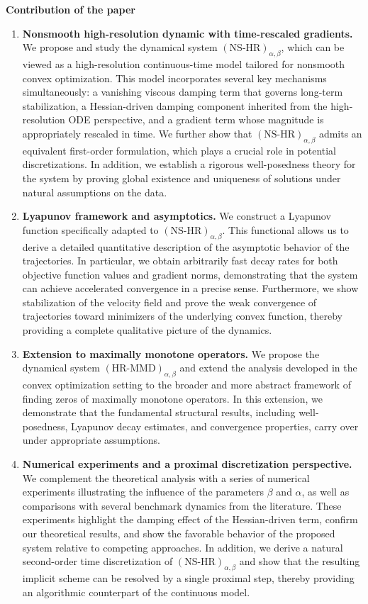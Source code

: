 \documentclass[11pt]{article}
\numberwithin{equation}{section}
\begin{document}
\textbf{Contribution of the paper} 
\begin{enumerate}
    \item \textbf{Nonsmooth high-resolution dynamic with time-rescaled gradients.} We propose and study the dynamical system $(\text{NS-HR})_{\alpha,\beta}$, which can be viewed as a high-resolution continuous-time model tailored for {nonsmooth} convex optimization. This model incorporates several key mechanisms simultaneously: a vanishing viscous damping term that governs long-term stabilization, a {Hessian-driven damping} component inherited from the high-resolution ODE perspective, and a gradient term whose magnitude is appropriately rescaled in time. We further show that $(\text{NS-HR})_{\alpha,\beta}$ admits an equivalent first-order formulation, which plays a crucial role in potential discretizations. In addition, we establish a rigorous well-posedness theory for the system by proving global existence and uniqueness of solutions under natural assumptions on the data.
    \item \textbf{Lyapunov framework and asymptotics.} We construct a Lyapunov function specifically adapted to $(\text{NS-HR})_{\alpha,\beta}$. This functional allows us to derive a detailed quantitative description of the asymptotic behavior of the trajectories. In particular, we obtain arbitrarily fast decay rates for both objective function values and gradient norms, demonstrating that the system can achieve accelerated convergence in a precise sense. Furthermore, we show stabilization of the velocity field and prove the {weak convergence} of trajectories toward minimizers of the underlying convex function, thereby providing a complete qualitative picture of the dynamics.
    \item \textbf{Extension to maximally monotone operators.}  
We propose the dynamical system $(\text{HR-MMD})_{\alpha,\beta}$ and extend the analysis developed in the convex optimization setting to the broader and more abstract framework of finding zeros of maximally monotone operators. In this extension, we demonstrate that the fundamental structural results, including well-posedness, Lyapunov decay estimates, and convergence properties, carry over under appropriate assumptions.
\item \textbf{Numerical experiments and a proximal discretization perspective.}
We complement the theoretical analysis with a series of numerical experiments illustrating the influence of the parameters \(\beta\) and \(\alpha\), as well as comparisons with several benchmark dynamics from the literature. These experiments highlight the damping effect of the Hessian-driven term, confirm our theoretical results, and show the favorable behavior of the proposed system relative to competing approaches. In addition, we derive a natural second-order time discretization of \((\mathrm{NS\text{-}HR})_{\alpha,\beta}\) and show that the resulting implicit scheme can be resolved by a single proximal step, thereby providing an algorithmic counterpart of the continuous model.
\end{enumerate}
\end{document}
